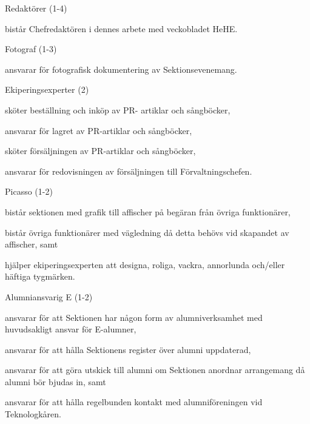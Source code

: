 \documentclass[10pt]{article}
\begin{document}
\begin{emptylist}
    	\item Redaktörer (1-4)
    		\begin{dashlist}
    			\item bistår Chefredaktören i dennes arbete med veckobladet HeHE.
    		\end{dashlist}
    \item Fotograf (1-3)
        \begin{dashlist}
            \item ansvarar för fotografisk dokumentering av Sektionsevenemang.
        \end{dashlist}
    \item Ekiperingsexperter (2)
        \begin{dashlist}
            \item sköter beställning och inköp av PR- artiklar och sångböcker,
            \item ansvarar för lagret av PR-artiklar och sångböcker,
            \item sköter försäljningen av PR-artiklar och sångböcker,
            \item ansvarar för redovisningen av försäljningen till Förvaltningschefen.
        \end{dashlist}
    \item Picasso (1-2)
		\begin{dashlist}
            \item bistår sektionen med grafik till affischer på begäran från övriga funktionärer,
            \item bistår övriga funktionärer med vägledning då detta behövs vid skapandet av affischer, samt
            \item hjälper ekiperingsexperten att designa, roliga, vackra, annorlunda och/eller häftiga tygmärken.
        \end{dashlist}
    \item Alumniansvarig E (1-2)
        \begin{dashlist}
            \item ansvarar för att Sektionen har någon form av alumniverksamhet med huvudsakligt ansvar för E-alumner,
            \item ansvarar för att hålla Sektionens register över alumni uppdaterad,
            \item ansvarar för att göra utskick till alumni om Sektionen anordnar arrangemang då alumni
bör bjudas in, samt
            \item  ansvarar för att hålla regelbunden kontakt med alumniföreningen vid Teknologkåren.

\end{dashlist}
\end{emptylist}
\end{document}
